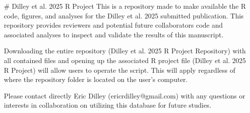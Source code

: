 # Dilley et al. 2025 R Project
This is a repository made to make available the R code, figures, and analyses for the Dilley et al. 2025 submitted publication.  This repository provides reviewers and potential future collaborators code and associated analyses to inspect and validate the results of this manuscript.  

Downloading the entire repository (Dilley et al. 2025 R Project Repository) with all contained files and opening up the associated R project file (Dilley et al. 2025 R Project) will allow users to operate the script.  This will apply regardless of where the repository folder is located on the user's computer.

Please contact directly Eric Dilley (ericrdilley@gmail.com) with any questions or interests in collaboration on utilizing this database for future studies.  
